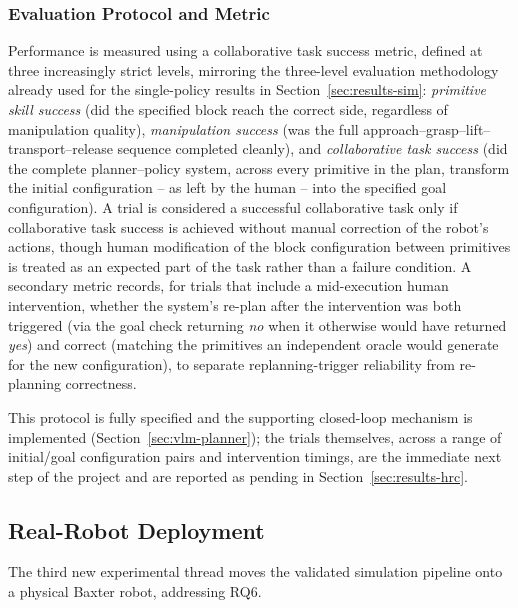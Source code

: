 \documentclass[12pt]{article}
\begin{document}
\subsubsection{Evaluation Protocol and Metric}
Performance is measured using a collaborative task success metric, defined at three increasingly strict levels, mirroring the three-level evaluation methodology already used for the single-policy results in Section~\ref{sec:results-sim}: \emph{primitive skill success} (did the specified block reach the correct side, regardless of manipulation quality), \emph{manipulation success} (was the full approach--grasp--lift--transport--release sequence completed cleanly), and \emph{collaborative task success} (did the complete planner--policy system, across every primitive in the plan, transform the initial configuration -- as left by the human -- into the specified goal configuration). A trial is considered a successful collaborative task only if collaborative task success is achieved without manual correction of the robot's actions, though human modification of the block configuration between primitives is treated as an expected part of the task rather than a failure condition. A secondary metric records, for trials that include a mid-execution human intervention, whether the system's re-plan after the intervention was both triggered (via the goal check returning \emph{no} when it otherwise would have returned \emph{yes}) and correct (matching the primitives an independent oracle would generate for the new configuration), to separate replanning-trigger reliability from re-planning correctness.

This protocol is fully specified and the supporting closed-loop mechanism is implemented (Section~\ref{sec:vlm-planner}); the trials themselves, across a range of initial/goal configuration pairs and intervention timings, are the immediate next step of the project and are reported as pending in Section~\ref{sec:results-hrc}.

\subsection{Real-Robot Deployment}
\label{sec:methodology-realrobot}

The third new experimental thread moves the validated simulation pipeline onto a physical Baxter robot, addressing RQ6.
\end{document}
